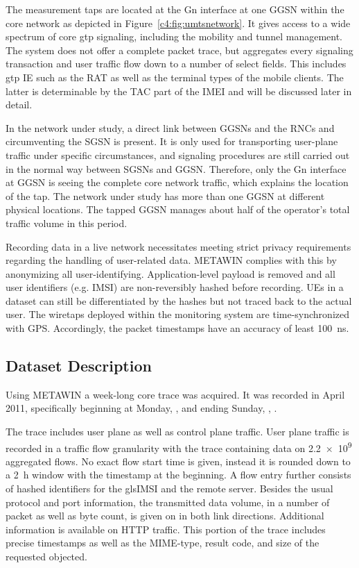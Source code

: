 The measurement taps are located at the Gn interface at one \gls{GGSN} within the core network as depicted in Figure~\ref{c4:fig:umtsnetwork}. It gives access to a wide spectrum of core \gls{gtp} signaling, including the mobility and tunnel management. The system does not offer a complete packet trace, but aggregates every signaling transaction and user traffic flow down to a number of select fields. This includes \gls{gtp} \gls{IE} such as the \gls{RAT} as well as the terminal types of the mobile clients. The latter is determinable by the \gls{TAC} part of the \gls{IMEI} and will be discussed later in detail.

In the network under study, a direct link between \glspl{GGSN} and the \glspl{RNC} and circumventing the \gls{SGSN} is present. It is only used for transporting user-plane traffic under specific circumstances, and signaling procedures are still carried out in the normal way between \glspl{SGSN} and \gls{GGSN}. Therefore, only the Gn interface at \gls{GGSN} is seeing the complete core network traffic, which explains the location of the tap. The network under study has more than one \gls{GGSN} at different physical locations. The tapped \gls{GGSN} manages about half of the operator's total traffic volume in this period. 

Recording data in a live network necessitates meeting strict privacy requirements regarding the handling of user-related data. \gls{METAWIN} complies with this by anonymizing all user-identifying. Application-level payload is removed and all user identifiers (e.g. \gls{IMSI}) are non-reversibly hashed before recording. \glspl{UE} in a dataset can still be differentiated by the hashes but not traced back to the actual user. The wiretaps deployed within the monitoring system are time-synchronized with \gls{GPS}. Accordingly, the packet timestamps have an accuracy of least \SI{100}{\nano\second}.


\subsection{Dataset Description}

Using \gls{METAWIN} a week-long core trace was acquired. It was recorded in April 2011, specifically beginning at Monday, \yyyymmdddate{},  and ending Sunday, , .

The trace includes user plane as well as control plane traffic. User plane traffic is recorded in a traffic flow granularity with the trace containing data on \num{2.2e9} aggregated flows. No exact flow start time is given, instead it is rounded down to a \SI{2}{\hour} window with the timestamp at the beginning. A flow entry further consists of hashed identifiers for the gls{IMSI} and the remote server. Besides the usual protocol and port information, the transmitted data volume, in a number of packet as well as byte count, is given on in both link directions. Additional information is available on \gls{HTTP} traffic. This portion of the trace includes precise timestamps as well as the \acrshort{MIME}-type, result code, and size of the requested objected.

